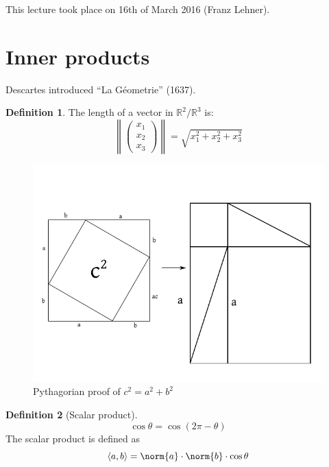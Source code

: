 \documentclass[a4paper,landscape,twocolumn]{article}
\newcommand\meta[3]{This #1 took place on #2 (#3).\par}
\newcommand\functional[1]{\left\langle{#1}\right\rangle}
\theoremstyle{definition}
\newtheorem{defi}{Definition}
\DeclarePairedDelimiter\norm\lVert\rVert
\begin{document}
\meta{lecture}{16th of March 2016}{Franz Lehner}

\section{Inner products}
%
Descartes introduced \enquote{La G\'eometrie} (1637).

\begin{defi}
  The length of a vector in $\mathbb R^2/\mathbb R^3$ is:
  \[ \left\| \begin{pmatrix} x_1 \\ x_2 \\ x_3 \end{pmatrix} \right\| = \sqrt{x_1^2 + x_2^2 + x_3^2} \]
\end{defi}

\begin{figure}[!h]
  \begin{center}
    \includegraphics{img/pythagorian-proof.pdf}
    \caption{Pythagorian proof of $c^2 = a^2 + b^2$}
    \label{img:pyth}
  \end{center}
\end{figure}

\begin{defi}[Scalar product]
  \[ \cos{\theta} = \cos(2\pi - \theta) \]
  The scalar product is defined as
  \[ \functional{a,b} = \norm{a} \cdot \norm{b} \cdot \cos{\theta} \]
\end{defi}
\end{document}

